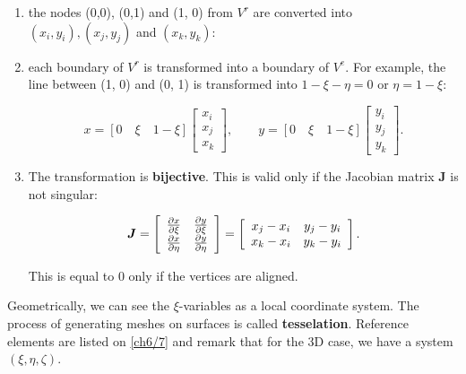 	\begin{enumerate}
	\item the nodes (0,0), (0,1) and (1, 0) from $V^r$ are converted into $(x_i, y_i), (x_j, y_j)$ and $(x_k, y_k)$: 
	
	\item each boundary of $V^r$ is transformed into a boundary of $V^e$. For example, the line between (1, 0) and (0, 1) is transformed into $1 -\xi-\eta =0$ or $\eta = 1- \xi$: 
	
	\begin{equation}
	x = [0 \quad \xi \quad 1- \xi] 
	\left[
	\begin{array}{c}
	x_i\\
	x_j\\
	x_k
	\end{array}
	\right] , 
	\qquad 
	y = [0 \quad \xi \quad 1-\xi] 
	\left[
	\begin{array}{c}
	y_i\\
	y_j\\
	y_k
	\end{array}
	\right].
	\end{equation}
	
	\item The transformation is \textbf{bijective}. This is valid only if the Jacobian matrix $\bm{J}$ is not singular:
	
	\begin{equation}
	\bm{J} = \left[
	\begin{array}{cc}
	\frac{\partial x}{\partial \xi} & \frac{\partial y}{\partial \xi}\\
	\frac{\partial x}{\partial \eta} & \frac{\partial y}{\partial \eta}
	\end{array}
	\right]
	= \left[
	\begin{array}{cc}
	x_j - x_i & y_j - y_i\\
	x_k - x_i & y_k - y_i
	\end{array}
	\right].
	\end{equation}
	
	This is equal to 0 only if the vertices are aligned. 
	\end{enumerate}
	
	Geometrically, we can see the $\xi$-variables as a local coordinate system. The process of generating meshes on surfaces is called \textbf{tesselation}. Reference elements are listed on \autoref{ch6/7} and remark that for the 3D case, we have a system $(\xi, \eta, \zeta)$.
	

